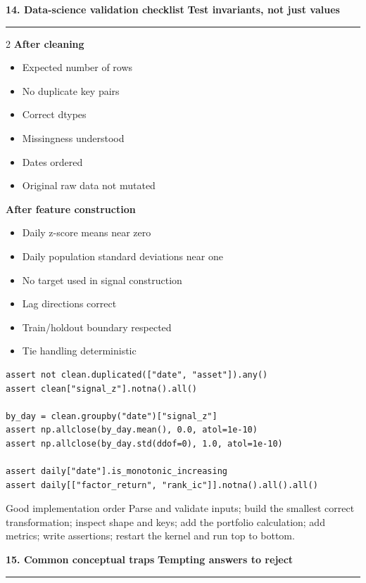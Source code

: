 \documentclass[10pt,a4paper]{article}
\newcommand{\sectionbanner}[2]{%
  \vspace{2mm}
  {\color{navy}\Large\bfseries #1}\hfill
  {\color{blue}\bfseries #2}
  \par\vspace{1mm}\color{line}\rule{\linewidth}{0.8pt}\color{ink}\vspace{2mm}
}
\begin{document}
\sectionbanner{14. Data-science validation checklist}{Test invariants, not just values}

\begin{multicols}{2}
\textbf{After cleaning}
\begin{itemize}
  \item Expected number of rows
  \item No duplicate key pairs
  \item Correct dtypes
  \item Missingness understood
  \item Dates ordered
  \item Original raw data not mutated
\end{itemize}

\columnbreak
\textbf{After feature construction}
\begin{itemize}
  \item Daily z-score means near zero
  \item Daily population standard deviations near one
  \item No target used in signal construction
  \item Lag directions correct
  \item Train/holdout boundary respected
  \item Tie handling deterministic
\end{itemize}
\end{multicols}

\begin{lstlisting}
assert not clean.duplicated(["date", "asset"]).any()
assert clean["signal_z"].notna().all()

by_day = clean.groupby("date")["signal_z"]
assert np.allclose(by_day.mean(), 0.0, atol=1e-10)
assert np.allclose(by_day.std(ddof=0), 1.0, atol=1e-10)

assert daily["date"].is_monotonic_increasing
assert daily[["factor_return", "rank_ic"]].notna().all().all()
\end{lstlisting}

\begin{keybox}{Good implementation order}
Parse and validate inputs; build the smallest correct transformation; inspect shape and keys; add the portfolio calculation; add metrics; write assertions; restart the kernel and run top to bottom.
\end{keybox}

\sectionbanner{15. Common conceptual traps}{Tempting answers to reject}
\end{document}
